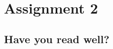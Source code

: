 \documentclass[assignments]{subfiles}
\begin{document}
\section{Assignment 2}


\subsection{Have you read well?}
\end{document}
